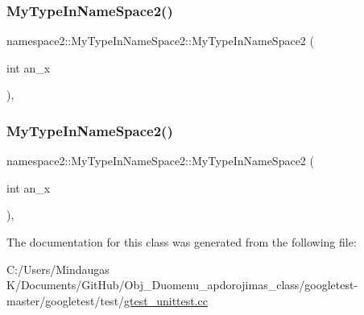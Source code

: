 \mbox{\label{classnamespace2_1_1_my_type_in_name_space2_a033025628289dbf29022b2bfbe66f53e}} 
\subsubsection{\texorpdfstring{MyTypeInNameSpace2()}{MyTypeInNameSpace2()}\hspace{0.1cm}{\footnotesize\ttfamily [2/3]}}
{\footnotesize\ttfamily namespace2\+::\+My\+Type\+In\+Name\+Space2\+::\+My\+Type\+In\+Name\+Space2 (\begin{DoxyParamCaption}\item[{int}]{an\+\_\+x }\end{DoxyParamCaption})\hspace{0.3cm}{\ttfamily [inline]}, {\ttfamily [explicit]}}

\mbox{\label{classnamespace2_1_1_my_type_in_name_space2_a033025628289dbf29022b2bfbe66f53e}} 
\subsubsection{\texorpdfstring{MyTypeInNameSpace2()}{MyTypeInNameSpace2()}\hspace{0.1cm}{\footnotesize\ttfamily [3/3]}}
{\footnotesize\ttfamily namespace2\+::\+My\+Type\+In\+Name\+Space2\+::\+My\+Type\+In\+Name\+Space2 (\begin{DoxyParamCaption}\item[{int}]{an\+\_\+x }\end{DoxyParamCaption})\hspace{0.3cm}{\ttfamily [inline]}, {\ttfamily [explicit]}}



The documentation for this class was generated from the following file\+:\begin{DoxyCompactItemize}
\item 
C\+:/\+Users/\+Mindaugas K/\+Documents/\+Git\+Hub/\+Obj\+\_\+\+Duomenu\+\_\+apdorojimas\+\_\+class/googletest-\/master/googletest/test/\mbox{\hyperlink{googletest-master_2googletest_2test_2gtest__unittest_8cc}{gtest\+\_\+unittest.\+cc}}\end{DoxyCompactItemize}
